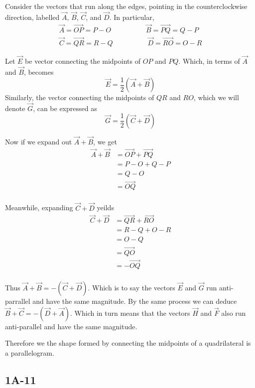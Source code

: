 Consider the vectors that run along the edges, pointing in the counterclockwise
direction, labelled $\vec{A}$, $\vec{B}$, $\vec{C}$, and $\vec{D}$. 
In particular, 
\begin{align*}
\vec{A} = \vec{OP} = P - O\hspace{5em}
\vec{B} = \vec{PQ} = Q - P\\ 
\vec{C} = \vec{QR} = R - Q\hspace{5em}
\vec{D} = \vec{RO} = O - R
\end{align*}

Let $\vec{E}$ be vector connecting the midpoints of $OP$ and $PQ$.
Which, in terms of $\vec{A}$ and $\vec{B}$, becomes 
\[\vec{E} = \frac{1}{2}(\vec{A} + \vec{B})\]
Similarly, the vector connecting the midpoints of $QR$ and $RO$, which
we will denote $\vec{G}$, can be expressed as 
\[\vec{G} = \frac{1}{2}(\vec{C} + \vec{D})\]

Now if we expand out $\vec{A} + \vec{B}$, we get
\begin{align*} 
\vec{A} + \vec{B} &= \vec{OP} + \vec{PQ}\\
                  &= P - O + Q - P\\
                  &=  Q - O \\
                  &=  \vec{OQ} \\
\end{align*}

Meanwhile, expanding $\vec{C} + \vec{D}$ yeilds
\begin{align*} 
\vec{C} + \vec{D} &= \vec{QR} + \vec{RO}\\ 
                  &= R - Q + O - R\\ 
                  &=  O - Q \\
                  &=  \vec{QO} \\
                  &=  -\vec{OQ} \\
\end{align*} 

Thus $\vec{A} + \vec{B} = -(\vec{C} + \vec{D})$.
Which is to say the vectors $\vec{E}$ and $\vec{G}$ run anti-parrallel 
and have the same magnitude. By the same process we can deduce 
$\vec{B}+\vec{C} = -(\vec{D}+\vec{A})$. 
Which in turn means that the vectors $\vec{H}$ and $\vec{F}$ also run 
anti-parallel  and have the same magnitude.

Therefore we the shape formed by connecting the midpoints of a 
quadrilateral is a parallelogram.



\subsection*{1A-11}



